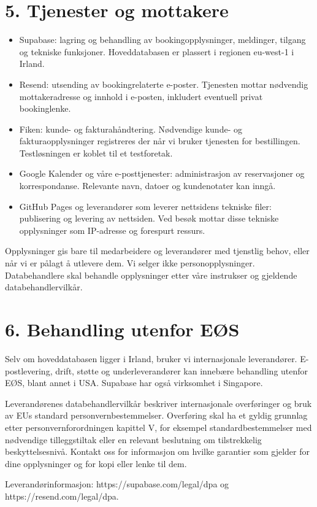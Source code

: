 \documentclass[12pt,a4paper]{article}
\begin{document}
\section{5. Tjenester og mottakere}
\begin{itemize}
\item Supabase: lagring og behandling av bookingopplysninger, meldinger, tilgang og tekniske funksjoner. Hoveddatabasen er plassert i regionen eu-west-1 i Irland.
\item Resend: utsending av bookingrelaterte e-poster. Tjenesten mottar nødvendig mottakeradresse og innhold i e-posten, inkludert eventuell privat bookinglenke.
\item Fiken: kunde- og fakturahåndtering. Nødvendige kunde- og fakturaopplysninger registreres der når vi bruker tjenesten for bestillingen. Testløsningen er koblet til et testforetak.
\item Google Kalender og våre e-posttjenester: administrasjon av reservasjoner og korrespondanse. Relevante navn, datoer og kundenotater kan inngå.
\item GitHub Pages og leverandører som leverer nettsidens tekniske filer: publisering og levering av nettsiden. Ved besøk mottar disse tekniske opplysninger som IP-adresse og forespurt ressurs.
\end{itemize}
Opplysninger gis bare til medarbeidere og leverandører med tjenstlig behov, eller når vi er pålagt å utlevere dem. Vi selger ikke personopplysninger. Databehandlere skal behandle opplysninger etter våre instrukser og gjeldende databehandlervilkår.


\section{6. Behandling utenfor EØS}
Selv om hoveddatabasen ligger i Irland, bruker vi internasjonale leverandører. E-postlevering, drift, støtte og underleverandører kan innebære behandling utenfor EØS, blant annet i USA. Supabase har også virksomhet i Singapore.

Leverandørenes databehandlervilkår beskriver internasjonale overføringer og bruk av EUs standard personvernbestemmelser. Overføring skal ha et gyldig grunnlag etter personvernforordningen kapittel V, for eksempel standardbestemmelser med nødvendige tilleggstiltak eller en relevant beslutning om tilstrekkelig beskyttelsesnivå. Kontakt oss for informasjon om hvilke garantier som gjelder for dine opplysninger og for kopi eller lenke til dem.

Leverandørinformasjon: https://supabase.com/legal/dpa og https://resend.com/legal/dpa.
\end{document}
